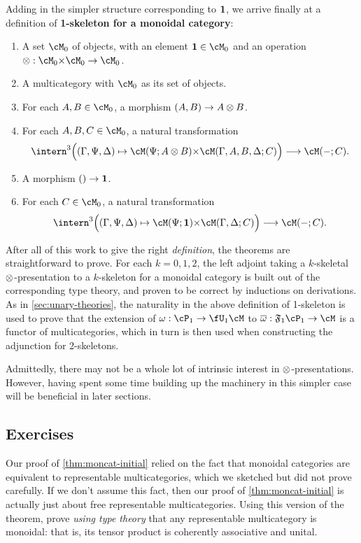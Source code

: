 Adding in the simpler structure corresponding to $\mathbf{1}$, we arrive finally at a definition of \textbf{1-skeleton for a monoidal category}:
\begin{enumerate}
\item A set $\cM_0$ of objects, with an element $\one\in\cM_0$ and an operation $\tensor:\cM_0\times \cM_0 \to \cM_0$.
\item A multicategory with $\cM_0$ as its set of objects.
\item For each $A,B\in\cM_0$, a morphism $(A,B)\to A\otimes B$.
\item For each $A,B,C\in\cM_0$, a natural transformation
  \[ \intern^3\Big((\Gamma,\Psi,\Delta) \mapsto \cM(\Psi;A\tensor B) \times \cM(\Gamma,A,B,\Delta;C)\Big) \too \cM(-;C). \]
\item A morphism $() \to \mathbf{1}$.
\item For each $C\in\cM_0$, a natural transformation
  \[ \intern^3\Big((\Gamma,\Psi,\Delta) \mapsto \cM(\Psi;\one) \times \cM(\Gamma,\Delta;C)\Big) \too \cM(-;C). \]
\end{enumerate}
After all of this work to give the right \emph{definition}, the theorems are straightforward to prove.
For each $k=0,1,2$, the left adjoint taking a $k$-skeletal $\otimes$-presentation to a $k$-skeleton for a monoidal category is built out of the corresponding type theory, and proven to be correct by inductions on derivations.
As in \cref{sec:unary-theories}, the naturality in the above definition of 1-skeleton is used to prove that the extension of $\pfree:\cP_1 \to \fU_1\cM$ to $\free:\F1\cP_1 \to \cM$ is a functor of multicategories, which in turn is then used when constructing the adjunction for 2-skeletons.

Admittedly, there may not be a whole lot of intrinsic interest in $\otimes$-presentations.
However, having spent some time building up the machinery in this simpler case will be beneficial in later sections.


\subsection*{Exercises}

\begin{ex}\label{ex:repmulticat-moncat}
  Our proof of \cref{thm:moncat-initial} relied on the fact that monoidal categories are equivalent to representable multicategories, which we sketched but did not prove carefully.
  If we don't assume this fact, then our proof of \cref{thm:moncat-initial} is actually just about free representable multicategories.
  Using this version of the theorem, prove \emph{using type theory} that any representable multicategory is monoidal: that is, its tensor product is coherently associative and unital.
\end{ex}


